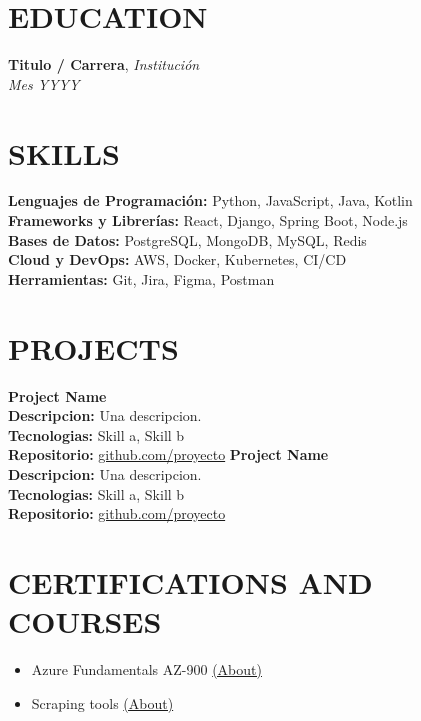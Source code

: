 \documentclass[11pt,a4paper]{article}
\begin{document}
\section*{EDUCATION}
\textbf{Titulo / Carrera}, \textit{Institución}\\
\textit{Mes YYYY}

\section*{SKILLS}
\textbf{Lenguajes de Programación:} Python, JavaScript, Java, Kotlin\\
\textbf{Frameworks y Librerías:} React, Django, Spring Boot, Node.js\\
\textbf{Bases de Datos:} PostgreSQL, MongoDB, MySQL, Redis\\
\textbf{Cloud y DevOps:} AWS, Docker, Kubernetes, CI/CD\\
\textbf{Herramientas:} Git, Jira, Figma, Postman

\section*{PROJECTS}
\textbf{Project Name}\\
\textbf{Descripcion:} Una descripcion.\\
\textbf{Tecnologias:} Skill a, Skill b\\
\textbf{Repositorio:} \href{https://github.com/proyecto}{github.com/proyecto}
\vspace{8pt}
\textbf{Project Name}\\
\textbf{Descripcion:} Una descripcion.\\
\textbf{Tecnologias:} Skill a, Skill b\\
\textbf{Repositorio:} \href{https://github.com/proyecto}{github.com/proyecto}

\section*{CERTIFICATIONS AND COURSES}
\begin{itemize}[leftmargin=1.2em]
    \item Azure Fundamentals AZ-900 \href{https://learn.microsoft.com/es-es/credentials/certifications/azure-fundamentals/?practice-assessment-type=certification}{(About)}
    \item Scraping tools \href{https://udemy.com/a-course}{(About)}
\end{itemize}
\end{document}
